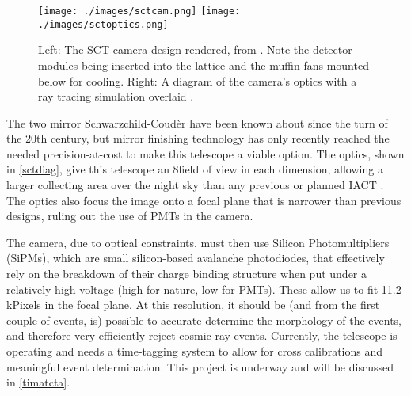 \begin{figure}[h!]
\begin{center}
\label{sctdiag}
\texttt{[image: ./images/sctcam.png]}
\texttt{[image: ./images/sctoptics.png]}
\caption[SCT Camera and Optics]{Left: The SCT camera design rendered, from \textcite{vladscope}. Note the detector modules being inserted into the lattice and the muffin fans mounted below for cooling. Right: A diagram of the camera's optics with a ray tracing simulation overlaid \cite{psctoptics}.}

\end{center}
\end{figure}

The two mirror Schwarzchild-Coud\`{e}r have been known about since the turn of the 20th century, but mirror finishing technology has only recently reached the needed precision-at-cost to make this telescope a viable option. The optics, shown in \autoref{sctdiag}, give this telescope an 8\degree field of view in each dimension, allowing a larger collecting area over the night sky than any previous or planned IACT \cite{psctoptics}. The optics also focus the image onto a focal plane that is narrower than previous designs, ruling out the use of PMTs in the camera.

The camera, due to optical constraints, must then use Silicon Photomultipliers (SiPMs), which are small silicon-based avalanche photodiodes, that effectively rely on the breakdown of their charge binding structure when put under a relatively high voltage (high for nature, low for PMTs). These allow us to fit 11.2 kPixels in the focal plane. At this resolution, it should be (and from the first couple of events, is) possible to accurate determine the morphology of the events, and therefore very efficiently reject cosmic ray events. Currently, the telescope is operating and needs a time-tagging system to allow for cross calibrations and meaningful event determination. This project is underway and will be discussed in \autoref{timatcta}.




